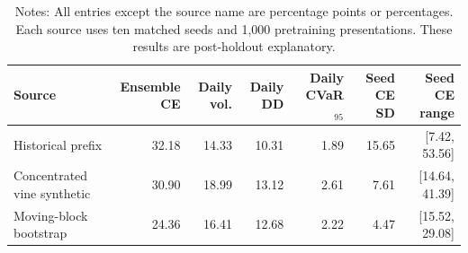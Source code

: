 \begin{table}[tbp]
\centering
\caption{Matched Pretraining Sources Under the Masked-State Architecture}
\label{tab:terminal-pretraining-tradeoff}
\small
\begin{tabular}{lrrrrrr}
\toprule
Source & Ensemble CE & Daily vol. & Daily DD & Daily CVaR$_{95}$ & Seed CE SD & Seed CE range \\
\midrule
Historical prefix & 32.18 & 14.33 & 10.31 & 1.89 & 15.65 & [7.42, 53.56] \\
Concentrated vine synthetic & 30.90 & 18.99 & 13.12 & 2.61 & 7.61 & [14.64, 41.39] \\
Moving-block bootstrap & 24.36 & 16.41 & 12.68 & 2.22 & 4.47 & [15.52, 29.08] \\
\bottomrule
\end{tabular}
\caption*{\footnotesize Notes: All entries except the source name are percentage points or percentages. Each source uses ten matched seeds and 1,000 pretraining presentations. These results are post-holdout explanatory.}
\end{table}
